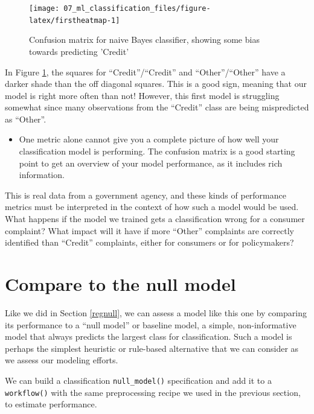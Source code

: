 \documentclass[
]{krantz}
\newenvironment{rmdblock}[1]
  {\begin{shaded*}
  \begin{itemize}[left = -1cm, labelsep = 1cm]
  \renewcommand{\labelitemi}{
    \raisebox{-.7\height}[0pt][0pt]{
      {\setkeys{Gin}{width=3em,keepaspectratio}\texttt{[image: images/\#1]}}
    }
  }
 
  \item
  }
  {
  \end{itemize}
  \end{shaded*}
  }
\newenvironment{rmdwarning}
  {\begin{rmdblock}{warning}}
  {\end{rmdblock}}
\begin{document}
\begin{figure}

{\centering \texttt{[image: 07\_ml\_classification\_files/figure-latex/firstheatmap-1]} 

}

\caption{Confusion matrix for naive Bayes classifier, showing some bias towards predicting 'Credit'}\label{fig:firstheatmap}
\end{figure}

In Figure \ref{fig:firstheatmap}, the squares for ``Credit''/``Credit'' and ``Other''/``Other'' have a darker shade than the off diagonal squares. This is a good sign, meaning that our model is right more often than not! However, this first model is struggling somewhat since many observations from the ``Credit'' class are being mispredicted as ``Other''.

\begin{rmdwarning}
One metric alone cannot give you a complete picture of how well your
classification model is performing. The confusion matrix is a good
starting point to get an overview of your model performance, as it
includes rich information.
\end{rmdwarning}


This is real data from a government agency, and these kinds of performance metrics must be interpreted in the context of how such a model would be used. What happens if the model we trained gets a classification wrong for a consumer complaint? What impact will it have if more ``Other'' complaints are correctly identified than ``Credit'' complaints, either for consumers or for policymakers?

\hypertarget{classnull}{%
\section{Compare to the null model}\label{classnull}}

Like we did in Section \ref{regnull}, we can assess a model like this one by comparing its performance to a ``null model'' or baseline model, a simple, non-informative model that always predicts the largest class for classification. Such a model is perhaps the simplest heuristic or rule-based alternative that we can consider as we assess our modeling efforts.

We can build a classification \texttt{null\_model()} specification and add it to a \texttt{workflow()} with the same preprocessing recipe we used in the previous section, to estimate performance.
\end{document}
